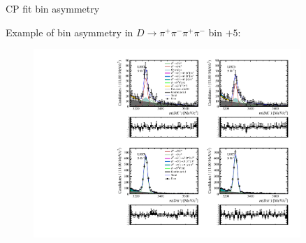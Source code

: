 \documentclass[xcolor={dvipsnames}]{beamer}
\begin{document}
\begin{frame}{CP fit bin asymmetry}
  \begin{center}
    {\large Example of bin asymmetry in $D\to\pi^+\pi^-\pi^+\pi^-$ bin $+5$:}
  \end{center}
  \begin{figure}
    \centering
    \includegraphics[width = 0.9\textwidth,trim={0 10cm 0 0},clip=true]{Plots/d2pipipipi_fiveL_binp5.pdf}
  \end{figure}
\end{frame}
\end{document}
